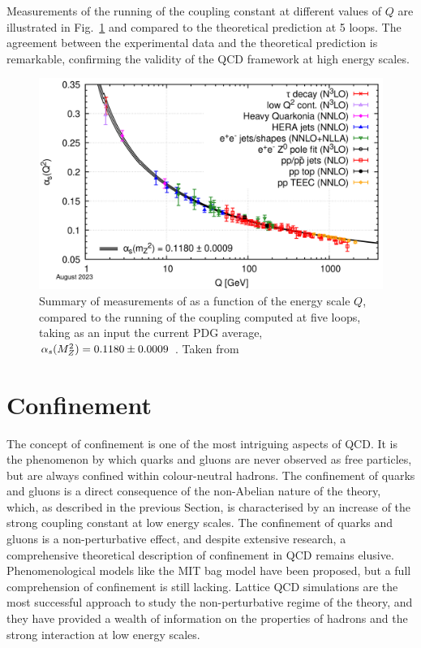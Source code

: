 Measurements of the running of the coupling constant at different values of $Q$ are illustrated in Fig.~\ref{fig:alpha_s_running} and compared to the theoretical prediction at 5 loops. The agreement between the experimental data and the theoretical prediction is remarkable, confirming the validity of the QCD framework at high energy scales.


\begin{figure}[htb]
    \centering
    \includegraphics[width=0.7\linewidth]{Figures/Chapter 1/Alpha_s_running.png}
    \caption{Summary of measurements of \als as a function of the energy scale $Q$, compared to the running of the coupling computed at five loops, taking as an input the current PDG average, $\alpha_s(M_Z^2) = 0.1180 \pm 0.0009$ \gevcc. Taken from \cite{pdg}}
    \label{fig:alpha_s_running}
\end{figure}

\section{Confinement}
The concept of confinement is one of the most intriguing aspects of QCD. It is the phenomenon by which quarks and gluons are never observed as free particles, but are always confined within colour-neutral hadrons. The confinement of quarks and gluons is a direct consequence of the non-Abelian nature of the theory, which, as described in the previous Section, is characterised by an increase of the strong coupling constant at low energy scales. The confinement of quarks and gluons is a non-perturbative effect, and despite extensive research, a comprehensive theoretical description of confinement in QCD remains elusive. Phenomenological models like the MIT bag model have been proposed, but a full comprehension of confinement is still lacking. Lattice QCD simulations are the most successful approach to study the non-perturbative regime of the theory, and they have provided a wealth of information on the properties of hadrons and the strong interaction at low energy scales.

